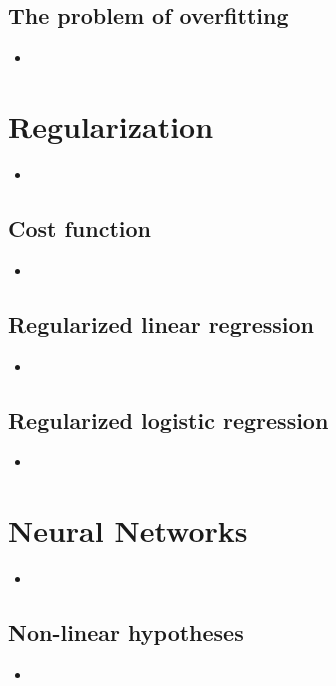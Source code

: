 \documentclass[13pt]{book}
\begin{document}
\section{The problem of overfitting}
\begin{itemize}
  \item
\end{itemize}

\chapter{Regularization}
\begin{itemize}
  \item
\end{itemize}

\section{Cost function}
\begin{itemize}
  \item
\end{itemize}

\section{Regularized linear regression}
\begin{itemize}
  \item
\end{itemize}

\section{Regularized logistic regression}
\begin{itemize}
  \item
\end{itemize}

\chapter{Neural Networks}
\begin{itemize}
  \item
\end{itemize}

\section{Non-linear hypotheses}
\begin{itemize}
  \item
\end{itemize}
\end{document}

